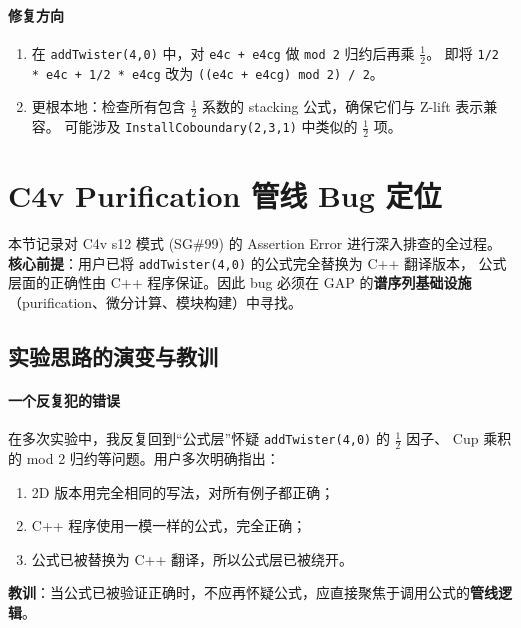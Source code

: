 \documentclass[a4paper,fontset=ubuntu,12pt]{ctexart}
\begin{document}
\paragraph{修复方向}
\begin{enumerate}
\item 在 \texttt{addTwister(4,0)} 中，对 \texttt{e4c + e4cg} 做 \texttt{mod 2} 归约后再乘 $\frac{1}{2}$。
      即将 \texttt{1/2 * e4c + 1/2 * e4cg} 改为 \texttt{((e4c + e4cg) mod 2) / 2}。
\item 更根本地：检查所有包含 $\frac{1}{2}$ 系数的 stacking 公式，确保它们与 Z-lift 表示兼容。
      可能涉及 \texttt{InstallCoboundary(2,3,1)} 中类似的 $\frac{1}{2}$ 项。
\end{enumerate}



\section{C4v Purification 管线 Bug 定位}
\label{sec:c4v-purify-bugs}

本节记录对 C4v s12 模式 (SG\#99) 的 Assertion Error 进行深入排查的全过程。
\textbf{核心前提}：用户已将 \texttt{addTwister(4,0)} 的公式完全替换为 C++ 翻译版本，
公式层面的正确性由 C++ 程序保证。因此 bug 必须在 GAP 的\textbf{谱序列基础设施}（purification、微分计算、模块构建）中寻找。

\subsection{实验思路的演变与教训}
\label{sec:exp-lessons}

\paragraph{一个反复犯的错误}
在多次实验中，我反复回到``公式层''怀疑 \texttt{addTwister(4,0)} 的 $\frac{1}{2}$ 因子、
Cup 乘积的 mod 2 归约等问题。用户多次明确指出：
\begin{enumerate}
\item 2D 版本用完全相同的写法，对所有例子都正确；
\item C++ 程序使用一模一样的公式，完全正确；
\item 公式已被替换为 C++ 翻译，所以公式层已被绕开。
\end{enumerate}
\textbf{教训}：当公式已被验证正确时，不应再怀疑公式，应直接聚焦于调用公式的\textbf{管线逻辑}。
\end{document}
